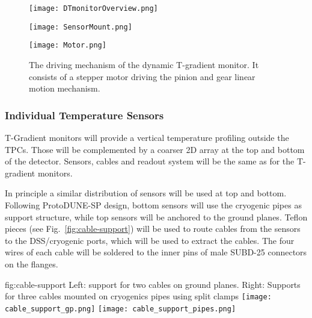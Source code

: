 \begin{figure}[htb]
\centering
\begin{minipage}{.12\textwidth}
  \centering
 \texttt{[image: DTmonitorOverview.png]}
\caption{An overview of the dynamic T-gradient monitor.}
\label{fig:DT_design}
\end{minipage}
\hfill
\begin{minipage}{0.555\textwidth}
\vspace{2.5in}
  \centering
  \texttt{[image: SensorMount.png]}
\caption{Sensor mounted on a PCB board and PCB board mounted on the rod. }
\label{fig:sensor_on_pcb}
\end{minipage}
\hfill
\begin{minipage}{0.27\textwidth}
\vspace{1in}
  \centering
  \texttt{[image: Motor.png]}
\caption{The driving mechanism of the dynamic T-gradient monitor. It consists of a stepper motor driving the pinion and gear linear motion mechanism. }
\label{fig:stepper_motor}
\end{minipage}
\end{figure}


\subsubsection{Individual Temperature Sensors}

T-Gradient monitors will provide a vertical temperature profiling outside the TPCs. Those will be complemented by a coarser 2D array at the top and bottom of the
detector. Sensors, cables and readout system will be the same as for the T-gradient monitors. 

In principle a similar distribution of sensors will be used at top and bottom.
Following ProtoDUNE-SP design, bottom sensors will use the cryogenic pipes as support structure, while top sensors will be anchored to the ground planes.
Teflon pieces (see Fig.~\ref{fig:cable-support}) will be used to route cables from the sensors to the DSS/cryogenic ports, which will be used to extract the cables.
The four wires of each cable will be soldered to the inner pins of male SUBD-25 connectors on the flanges. 

\begin{dunefigure}{fig:cable-support}
  {Left: support for two cables on ground planes. Right: Supports for three cables  mounted on cryogenics pipes using split clamps}
  \texttt{[image: cable\_support\_gp.png]}
  \texttt{[image: cable\_support\_pipes.png]}
\end{dunefigure}


